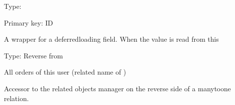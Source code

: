 \documentclass[letterpaper,10pt,russian]{sphinxmanual}
\begin{document}
\begin{fulllineitems}
\begin{fulllineitems}
\end{fulllineitems}


\begin{fulllineitems}
\label{\detokenize{myapp:polls.models.User.id}}
\pysigstartsignatures
\pysigline
{}
\pysigstopsignatures
\sphinxAtStartPar
Type: 

\sphinxAtStartPar
Primary key: ID

\sphinxAtStartPar
A wrapper for a deferred\sphinxhyphen{}loading field. When the value is read from this

\end{fulllineitems}


\begin{fulllineitems}
\label{\detokenize{myapp:polls.models.User.objects}}
\pysigstartsignatures
\pysigline
{}
\pysigstopsignatures
\end{fulllineitems}


\begin{fulllineitems}
\label{\detokenize{myapp:polls.models.User.order_set}}
\pysigstartsignatures
\pysigline
{}
\pysigstopsignatures
\sphinxAtStartPar
Type: Reverse  from {\hyperref[\detokenize{myapp:polls.models.Order}]{}}

\sphinxAtStartPar
All orders of this user (related name of {\hyperref[\detokenize{myapp:polls.models.Order.user}]{}})

\sphinxAtStartPar
Accessor to the related objects manager on the reverse side of a
many\sphinxhyphen{}to\sphinxhyphen{}one relation.


\end{fulllineitems}
\end{fulllineitems}
\end{document}
